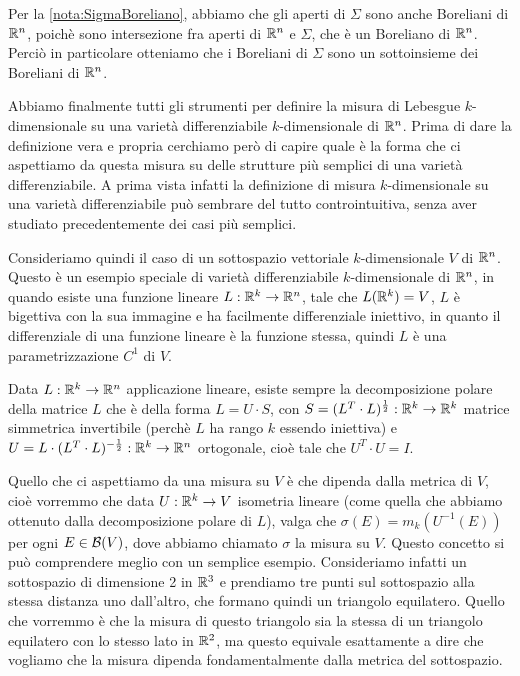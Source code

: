 \begin{remark}\label{nota:BorelianiSottovarieta}
	Per la \cref{nota:SigmaBoreliano}, abbiamo che gli aperti di $\Sigma$ sono anche Boreliani di $\mathbb R^n$, poichè sono intersezione fra aperti di $\mathbb R^n$ e $\Sigma$, che è un Boreliano di $\mathbb R^n$. Perciò in particolare otteniamo che i Boreliani di $\Sigma$ sono un sottoinsieme dei Boreliani di $\mathbb R^n$.
\end{remark}

Abbiamo finalmente tutti gli strumenti per definire la misura di Lebesgue $k$-dimensionale su una varietà differenziabile $k$-dimensionale di $\mathbb R^n$. Prima di dare la definizione vera e propria cerchiamo però di capire quale è la forma che ci aspettiamo da questa misura su delle strutture più semplici di una varietà differenziabile. A prima vista infatti la definizione di misura $k$-dimensionale su una varietà differenziabile può sembrare del tutto controintuitiva, senza aver studiato precedentemente dei casi più semplici.

Consideriamo quindi il caso di un sottospazio vettoriale $k$-dimensionale $V$ di $\mathbb R^n$. Questo è un esempio speciale di varietà differenziabile $k$-dimensionale di $\mathbb R^n$, in quando esiste una funzione lineare $L:\mathbb R^k\to \mathbb R^n$, tale che $L(\mathbb R^k)=V$, $L$ è bigettiva con la sua immagine e ha facilmente differenziale iniettivo, in quanto il differenziale di una funzione lineare è la funzione stessa, quindi $L$ è una parametrizzazione $C^1$ di $V$.

Data $L:\mathbb R^k\to\mathbb R^n$ applicazione lineare, esiste sempre la decomposizione polare della matrice $L$ che è della forma $L=U\cdot S$, con $S=(L^T\cdot L)^{\frac 12}:\mathbb R^k\to\mathbb R^k$ matrice simmetrica invertibile (perchè $L$ ha rango $k$ essendo iniettiva) e $U=L\cdot (L^T\cdot L)^{-\frac 12}:\mathbb R^k\to\mathbb R^n$ ortogonale, cioè tale che $U^T\cdot U=I$.

Quello che ci aspettiamo da una misura su $V$ è che dipenda dalla metrica di $V$, cioè vorremmo che data $U:\mathbb R^k\to V$ isometria lineare (come quella che abbiamo ottenuto dalla decomposizione polare di $L$), valga che $\sigma(E)=m_k(U^{-1}(E))$ per ogni $E\in\mathcal B(V)$, dove abbiamo chiamato $\sigma$ la misura su $V$. Questo concetto si può comprendere meglio con un semplice esempio. Consideriamo infatti un sottospazio di dimensione 2 in $\mathbb R^3$ e prendiamo tre punti sul sottospazio alla stessa distanza uno dall'altro, che formano quindi un triangolo equilatero. Quello che vorremmo è che la misura di questo triangolo sia la stessa di un triangolo equilatero con lo stesso lato in $\mathbb R^2$, ma questo equivale esattamente a dire che vogliamo che la misura dipenda fondamentalmente dalla metrica del sottospazio.

